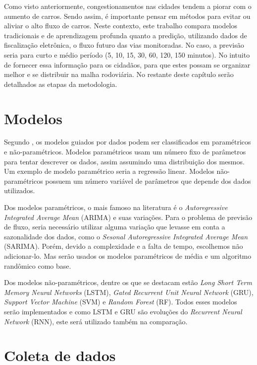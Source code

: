 
Como visto anteriormente, congestionamentos nas cidades tendem a piorar com o aumento de carros. Sendo assim, é importante pensar em métodos para evitar ou aliviar o alto fluxo de carros. Neste contexto, este trabalho compara modelos tradicionais e de aprendizagem profunda quanto a predição, utilizando dados de fiscalização eletrônica, o fluxo futuro das vias monitoradas. No caso, a previsão seria para curto e médio período (5, 10, 15, 30, 60, 120, 150 minutos). No intuito de fornecer essa informação para os cidadãos, para que estes possam se organizar melhor e se distribuir na malha rodoviária. No restante deste capítulo serão detalhados as etapas da metodologia.

\section{Modelos}

Segundo \cite{b5}, os modelos guiados por dados podem ser classificados em paramétricos e não-paramétricos. Modelos paramétricos usam um número fixo de parâmetros para tentar descrever os dados, assim assumindo uma distribuição dos mesmos. Um exemplo de modelo paramétrico seria a regressão linear. Modelos não-paramétricos possuem um número variável de parâmetros que depende dos dados utilizados.

Dos modelos paramétricos, o mais famoso na literatura é o \textit{Autoregressive Integrated Average Mean} (ARIMA) e suas variações. Para o problema de previsão de fluxo, seria necessário utilizar alguma variação que levasse em conta a sazonalidade dos dados, como o \textit{Sesonal Autoregressive Integrated Average Mean} (SARIMA). Porém, devido a complexidade e a falta de tempo, escolhemos não adicionar-lo. Mas serão usados os modelos paramétricos de média e um algoritmo randômico como base.

Dos modelos não-paramétricos, dentre os que se destacam estão \textit{Long Short Term Memory Neural Networks} (LSTM), \textit{Gated Recurrent Unit Neural Network} (GRU), \textit{Support Vector Machine} (SVM) e \textit{Random Forest} (RF). Todos esses modelos serão implementados e como LSTM e GRU são evoluções do \textit{Recurrent Neural Network} (RNN), este será utilizado também na comparação. 

\section{Coleta de dados}

